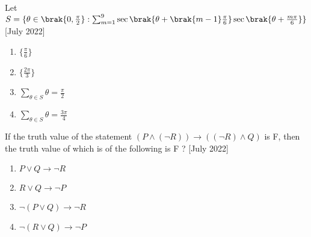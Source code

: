     \item Let $S=\{\theta \in \brak{0,\frac{\pi}{2}} :\sum_{m=1}^{9}\sec \brak{\theta+\brak{m-1}\frac{\pi}{6}}\sec \brak{\theta+\frac{m\pi}{6}}\}$
 \hfill{[July 2022]}
		\begin{multicols}{1}
			\begin{enumerate}
				\item $\{\frac{\pi}{6}\}$
				\item $\{\frac{2\pi}{3}\}$
				\item $\sum_{\theta \in S}\theta =\frac{\pi}{2}$
				\item $\sum_{\theta \in S}\theta =\frac{3\pi}{4}$
			\end{enumerate}
		\end{multicols}

    \item If the truth value of the statement $(P\land(\neg R))\rightarrow ((\neg R) \land Q)$ is F, then the truth value of which is of the following is F ?
    \hfill{[July 2022]}
		\begin{multicols}{1}
			\begin{enumerate}
				\item $P \lor Q \rightarrow \neg R$
				\item $R \lor Q \rightarrow \neg P$
				\item $\neg (P \lor Q) \rightarrow \neg R$
				\item $\neg (R \lor Q) \rightarrow \neg P$
			\end{enumerate}
		\end{multicols}


